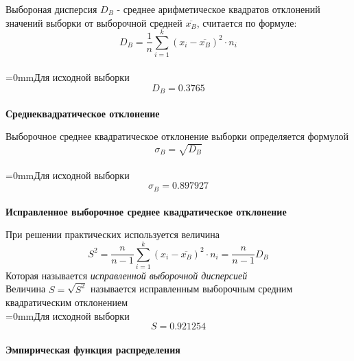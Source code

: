 \smallskip
\parindent=0mm Выбороная дисперсия $D_B$ - среднее арифметическое квадратов отклонений значений выборки от выборочной средней $\overline{x_B}$, считается по формуле: $$D_B = \frac{1}{n} \sum_{i=1}^k (x_i - \overline{x_B})^2 \cdot n_i$$\\
\newpage
\parindent=0mmДля исходной выборки $$D_B = 0.3765$$\\
\textbf{\large Среднеквадратическое отклонение}

\smallskip
\parindent=0mm Выборочное среднее квадратическое отклонение выборки определяется формулой $$\sigma_B = \sqrt{D_B}$$\\
\parindent=0mmДля исходной выборки $$\sigma_B = 0.897927$$\\
\textbf{\large Исправленное выборочное среднее квадратическое отклонение}

\smallskip
\parindent=0mm При решении практических используется величина $$S^2 = \frac{n}{n - 1} \sum_{i=1}^k (x_i - \overline{x_B})^2 \cdot n_i = \frac{n}{n - 1}D_B$$ Которая называется \textit{исправленной выборочной дисперсией}\\
\parindent=0mm Величина $S = \sqrt{S^2}$ называется исправленным выборочным средним квадратическим отклонением\\
\parindent=0mmДля исходной выборки $$S = 0.921254$$\\
\textbf{\large Эмпирическая функция распределения}

